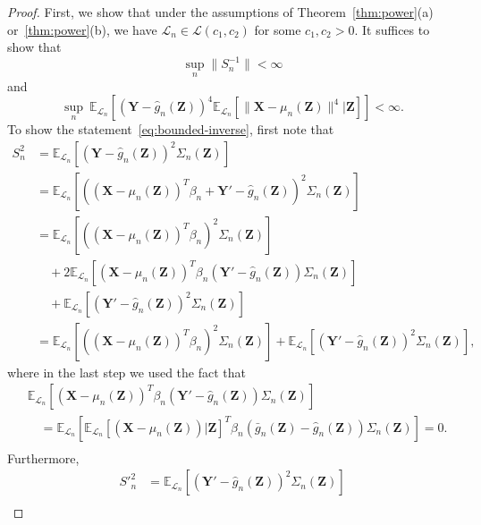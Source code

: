 \documentclass[12pt]{article}
\theoremstyle{definition}
\theoremstyle{remark}
\newcommand{\prx}{\bm X}
\newcommand{\prz}{\bm Z}
\newcommand{\pry}{{\bm Y}}
\begin{document}
\begin{proof}
First, we show that under the assumptions of Theorem~\ref{thm:power}(a) or~\ref{thm:power}(b), we have $\mathcal L_n \in \mathscr L(c_1, c_2)$ for some $c_1, c_2 > 0$. It suffices to show that
\begin{equation}
\sup_{n} \|S_n^{-1}\| < \infty
\label{eq:bounded-inverse}
\end{equation}
and
\begin{equation}
\sup_n\ \mathbb E_{\mathcal L_n}\left[(\pry - \widehat g_n(\prz))^{4} \mathbb E_{\mathcal L_n}[\|\prx - \mu_n(\prz)\|^{4}|\prz]\right] < \infty.
\label{eq:bounded-eighth-moment}
\end{equation}
To show the statement~\eqref{eq:bounded-inverse}, first note that
\begin{equation}
	\begin{split}
		S_n^2 &= \mathbb E_{\mathcal L_n}[(\pry - \widehat g_n(\prz))^2 \Sigma_n(\prz)] \\
		&=   \mathbb E_{\mathcal L_n}[((\prx - \mu_n(\prz))^T \beta_n + \pry'-\widehat g_n(\prz))^2 \Sigma_n(\prz)] \\
		&= \mathbb E_{\mathcal L_n}[((\prx - \mu_n(\prz))^T \beta_n)^2\Sigma_n(\prz)]  \\
		&\quad+2\mathbb E_{\mathcal L_n}[(\prx - \mu_n(\prz))^T \beta_n( \pry'-\widehat g_n(\prz))\Sigma_n(\prz)] \\
		&\quad + \mathbb E_{\mathcal L_n}[( \pry'-\widehat g_n(\prz))^2 \Sigma_n(\prz)] \\
		&= \mathbb E_{\mathcal L_n}[((\prx - \mu_n(\prz))^T \beta_n)^2\Sigma_n(\prz)] + \mathbb E_{\mathcal L_n}[(\pry'-\widehat g_n(\prz))^2 \Sigma_n(\prz)],
		\label{eq:s-n-2}
	\end{split}
\end{equation}
where in the last step we used the fact that
\begin{equation*}
	\begin{split}
		&\mathbb E_{\mathcal L_n}[(\prx - \mu_n(\prz))^T \beta_n( \pry'-\widehat g_n(\prz))\Sigma_n(\prz)] \\
		&\quad=\mathbb E_{\mathcal L_n}[\mathbb E_{\mathcal L_n}[(\prx - \mu_n(\prz))|\prz]^T \beta_n( \bar g_n(\prz)-\widehat g_n(\prz))\Sigma_n(\prz)] = 0. \\
	\end{split}
\end{equation*}
Furthermore, 
\begin{equation}
	\begin{split}
		S'^2_n &= \mathbb E_{\mathcal L_n}[(\pry'-\widehat g_n(\prz))^2 \Sigma_n(\prz)] \\

\end{split}
\end{equation}
\end{proof}
\end{document}
